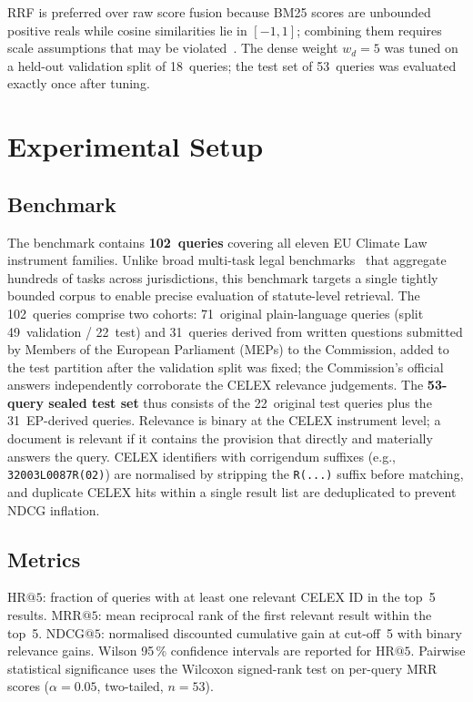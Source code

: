 \documentclass[conference]{IEEEtran}
\makeatletter
\newcommand{\HR}[1]{\mathrm{HR}@{#1}}
\newcommand{\MRR}[1]{\mathrm{MRR}@{#1}}
\newcommand{\NDCG}[1]{\mathrm{NDCG}@{#1}}
\makeatother
\begin{document}
RRF is preferred over raw score fusion because BM25 scores are
unbounded positive reals while cosine similarities lie in
$[-1,1]$; combining them requires scale assumptions that may be
violated~\cite{15}.
The dense weight $w_d{=}5$ was tuned on a held-out validation split
of 18~queries; the test set of 53~queries was evaluated exactly once
after tuning.

\section{Experimental Setup}

\subsection{Benchmark}

The benchmark contains \textbf{102~queries} covering all eleven EU
Climate Law instrument families.
Unlike broad multi-task legal benchmarks~\cite{20} that aggregate
hundreds of tasks across jurisdictions, this benchmark targets a single
tightly bounded corpus to enable precise evaluation of statute-level
retrieval.
The 102~queries comprise two cohorts: 71~original plain-language
queries (split 49~validation / 22~test) and 31~queries derived from
written questions submitted by Members of the European Parliament (MEPs)
to the Commission, added to the test partition after the validation
split was fixed; the Commission's official answers independently
corroborate the CELEX relevance judgements.
The \textbf{53-query sealed test set} thus consists of the 22~original
test queries plus the 31~EP-derived queries.
Relevance is binary at the CELEX instrument level; a document is
relevant if it contains the provision that directly and materially
answers the query.
CELEX identifiers with corrigendum suffixes (e.g.,
\texttt{32003L0087R(02)}) are normalised by stripping the
\texttt{R(...)} suffix before matching, and duplicate CELEX hits within
a single result list are deduplicated to prevent NDCG inflation.

\subsection{Metrics}

$\HR{5}$: fraction of queries with at least one relevant CELEX ID in
the top~5 results.
$\MRR{5}$: mean reciprocal rank of the first relevant result within
the top~5.
$\NDCG{5}$: normalised discounted cumulative gain at cut-off~5 with
binary relevance gains.
Wilson 95\,\% confidence intervals are reported for $\HR{5}$.
Pairwise statistical significance uses the Wilcoxon signed-rank test
on per-query MRR scores ($\alpha{=}0.05$, two-tailed, $n{=}53$).
\end{document}
